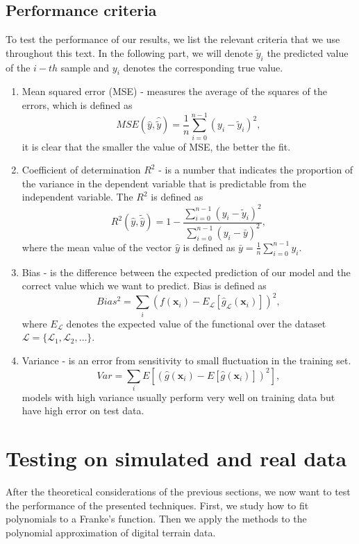 \documentclass [11pt]{article}
\begin{document}
\subsection{Performance criteria}
To test the performance of our results, we list the relevant criteria that we use throughout this text. In the following part, we will denote $\tilde{y}_i$  the predicted value of the $i-th$ sample and $y_i$ denotes the corresponding true value.\\
\begin{enumerate}
\item Mean squared error (MSE) - measures the average of the squares of the errors, which is defined as
\begin{equation}
MSE(\hat{y},\hat{\tilde{y}}) = \frac{1}{n}
\sum_{i=0}^{n-1}(y_i-\tilde{y}_i)^2,
\end{equation}
it is clear that the smaller the value of MSE, the better the fit.
\item Coefficient of determination $R^{2}$ - is a number that indicates the proportion of the variance in the dependent variable that is predictable from the independent variable. The $R^2$ is defined as
\begin{equation}
R^2(\hat{y}, \tilde{\hat{y}}) = 1 - \frac{\sum_{i=0}^{n - 1} (y_i - \tilde{y}_i)^2}{\sum_{i=0}^{n - 1} (y_i - \bar{y})^2},
\end{equation}
where the mean value of the vector $\hat{y}$ is defined as $\bar{y} =  \frac{1}{n} \sum_{i=0}^{n - 1} y_i$.
\item Bias - is the difference between the expected prediction of our model and the correct value which we want to predict. Bias is defined as
\begin{equation}
Bias^2= \sum_i (f(\boldsymbol{x}_i)-E_\mathcal{L}[\hat{g}_\mathcal{L}(\boldsymbol{x}_i)])^2,
\end{equation}
where $E_{\mathcal{L}}$ denotes the expected value of the functional over the dataset $\mathcal{L}=\{\mathcal{L}_1,
\mathcal{L}_2, \ldots \}$.
\item Variance - is an error from sensitivity to small fluctuation in the training set.
\begin{equation}
Var=\sum_i E[( \hat{g}(\boldsymbol{x}_i)-E[\hat{g}(\boldsymbol{x}_i)])^2],
\end{equation}
models with high variance usually perform very well on training data but have high error on test data.
\end{enumerate}
\section{Testing on simulated and real data}
After the theoretical considerations of the previous sections, we now want to test the performance of the presented techniques. First, we study how to fit polynomials to a Franke's function. Then we apply the methods to the polynomial approximation of digital terrain data.
\end{document}
